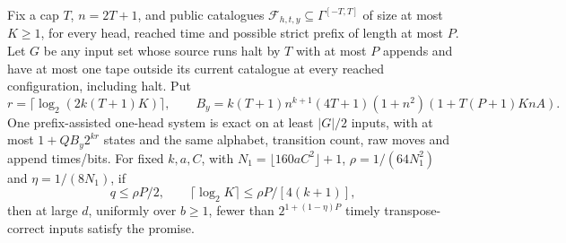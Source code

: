 \begin{theorem}\label{thm:catalogue}
\notformalized
Fix a cap $T$, $n=2T+1$, and public catalogues
$\mathcal F_{h,t,y}\subseteq\Gamma^{[-T,T]}$ of size at most $K\ge1$,
for every head, reached time and possible strict prefix of length at most
$P$. Let $G$ be any input set whose source runs halt by $T$ with at most
$P$ appends and have at most one tape outside its current catalogue at every
reached configuration, including halt. Put
\[
 r=\lceil\log_2(2k(T+1)K)\rceil,\qquad
 B_y=k(T+1)n^{k+1}(4T+1)(1+n^2)(1+T(P+1)KnA).
\]
One prefix-assisted one-head system is exact on at least $|G|/2$ inputs,
with at most $1+QB_y2^{kr}$ states and the same alphabet, transition count,
raw moves and append times/bits. For fixed $k,a,C$, with
$N_1=\lfloor160aC^2\rfloor+1$, $\rho=1/(64N_1^2)$ and
$\eta=1/(8N_1)$, if
\[
 q\le\rho P/2,\qquad \lceil\log_2 K\rceil\le \rho P/[4(k+1)],
\]
then at large $d$, uniformly over $b\ge1$, fewer than
$2^{1+(1-\eta)P}$ timely transpose-correct inputs satisfy the promise.
\end{theorem}
